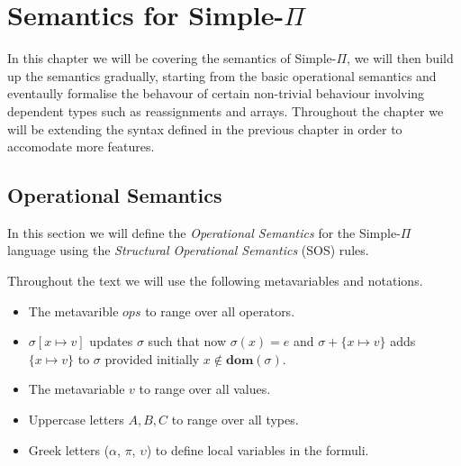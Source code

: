 \documentclass[a4paper,12pt]{report}
\begin{document}
\chapter{Semantics for Simple-$\Pi$}
In this chapter we will be covering the semantics of Simple-$\Pi$, we will 
then build up the semantics gradually, starting from the basic 
operational semantics and eventaully formalise the behavour of certain 
non-trivial behaviour involving dependent types such as reassignments and 
arrays. Throughout the chapter we will be extending the syntax defined in the 
previous chapter in order to accomodate more features.

\section{Operational Semantics}
In this section we will define the \textit{Operational Semantics} 
\cite{operationalSemantics} for the Simple-$\Pi$ language 
using the \textit{Structural Operational Semantics} \cite{plotkinSOS} (SOS) rules. 

\par
Throughout the text we will use the following metavariables and notations. 
\begin{itemize}
  \item The metavarible $ops$ to range over all operators.
  \item $\sigma[x \mapsto v]$ updates $\sigma$ such that now $\sigma(x) = e$ and 
  $\sigma + \{x \mapsto v\}$ adds $\{x \mapsto v\}$ to $\sigma$ provided 
  initially $x \notin\textbf{dom}(\sigma)$.
  \item The metavariable $v$ to range over all values.
  \item Uppercase letters $A,B,C$ to range over all types.
  \item Greek letters ($\alpha$, $\pi$, $\upsilon$) to define local variables in 
  the formuli. 
\end{itemize}
\end{document}
